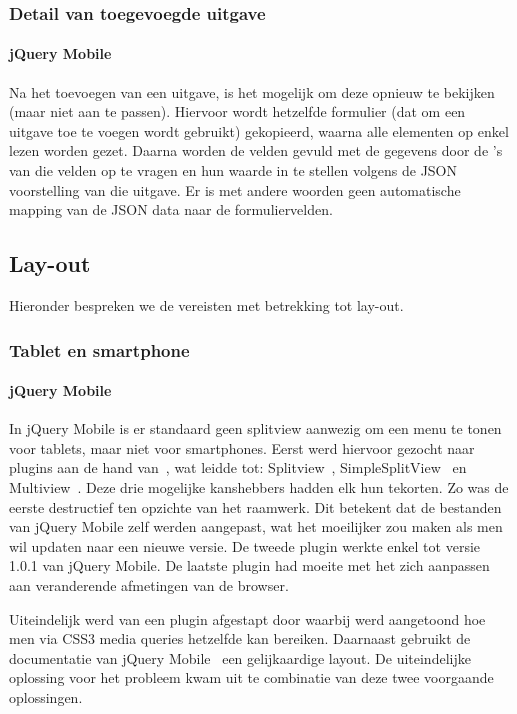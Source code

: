 \subsubsection{Detail van toegevoegde uitgave}

\paragraph{jQuery Mobile} 
Na het toevoegen van een uitgave, is het mogelijk om deze opnieuw te bekijken (maar niet aan te passen).
Hiervoor wordt hetzelfde formulier (dat om een uitgave toe te voegen wordt gebruikt) gekopieerd, waarna alle elementen op enkel lezen worden gezet.
Daarna worden de velden gevuld met de gegevens door de 's van die velden op te vragen en hun waarde in te stellen volgens de JSON voorstelling van die uitgave. 
Er is met andere woorden geen automatische mapping van de JSON data naar de formuliervelden. 

\subsection{Lay-out}
Hieronder bespreken we de vereisten met betrekking tot lay-out.

\subsubsection{Tablet en smartphone}

\paragraph{jQuery Mobile} 
In jQuery Mobile is er standaard geen splitview aanwezig om een menu te tonen voor tablets, maar niet voor smartphones. Eerst werd hiervoor gezocht naar plugins aan de hand van~\cite{Deering2012}, wat leidde tot: Splitview~\cite{Rahman2013}, SimpleSplitView~\cite{Yared2013} en Multiview~\cite{Franck2012}. Deze drie mogelijke kanshebbers hadden elk hun tekorten. Zo was de eerste destructief ten opzichte van het raamwerk. Dit betekent dat de bestanden van jQuery Mobile zelf werden aangepast, wat het moeilijker zou maken als men wil updaten naar een nieuwe versie. De tweede plugin werkte enkel tot versie 1.0.1 van jQuery Mobile. De laatste plugin had moeite met het zich  aanpassen aan veranderende afmetingen van de browser. 

Uiteindelijk werd van een plugin afgestapt door \cite{Hadlock2012} waarbij werd aangetoond hoe men via CSS3 media queries hetzelfde kan bereiken. Daarnaast gebruikt de documentatie van jQuery Mobile~\cite{JQuery2012b} een gelijkaardige layout. De uiteindelijke oplossing voor het probleem kwam uit te combinatie van deze twee voorgaande oplossingen.

